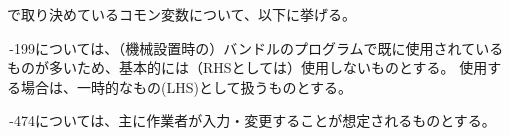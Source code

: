 
\DMname で取り決めているコモン変数について、以下に挙げる。



\,-\ttNum199については、（機械設置時の）バンドルのプログラムで既に使用されているものが多いため、基本的には（RHSとしては）使用しないものとする。
使用する場合は、一時的なもの(LHS)として扱うものとする。



\clearpage
\,-\ttNum474については、主に作業者が入力・変更することが想定されるものとする。\\

